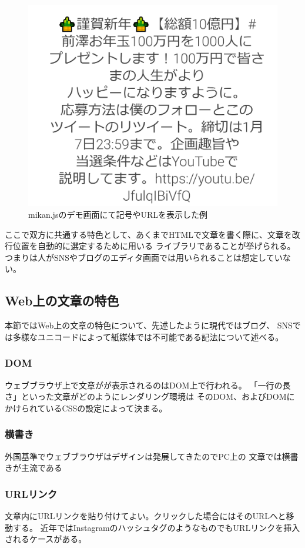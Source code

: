 \begin{figure}[H]
    \centering
    \label{fig:image8}
    \includegraphics[width=0.6\columnwidth]{image/02/img3.png}
    \caption[mikan.jsのデモ画面にて記号やURLを表示した例] {mikan.jsのデモ画面にて記号やURLを表示した例\footnotemark[4]}
\end{figure}

\newpage

ここで双方に共通する特色として、あくまでHTMLで文章を書く際に、文章を改行位置を自動的に選定するために用いる
ライブラリであることが挙げられる。つまりは人がSNSやブログのエディタ画面では用いられることは想定していない。

\subsection{Web上の文章の特色}
本節ではWeb上の文章の特色について、先述したように現代ではブログ、
SNSでは多様なユニコードによって紙媒体では不可能である記法について述べる。

\subsubsection{DOM}
ウェブブラウザ上で文章がが表示されるのはDOM上で行われる。
「一行の長さ」といった文章がどのようにレンダリング環境は
そのDOM、およびDOMにかけられているCSSの設定によって決まる。

\subsubsection{横書き}
外国基準でウェブブラウザはデザインは発展してきたのでPC上の
文章では横書きが主流である

\subsubsection{URLリンク}
文章内にURLリンクを貼り付けてよい。クリックした場合にはそのURLへと移動する。
近年ではInstagramのハッシュタグのようなものでもURLリンクを挿入されるケースがある。

